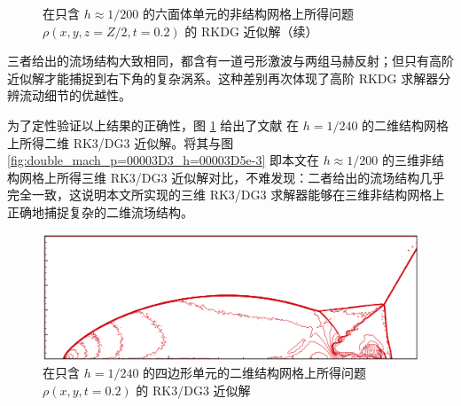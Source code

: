\begin{figure}[h!]
\begin{centering}
\par\end{centering}
\caption{在只含 $h\approx1/200$ 的六面体单元的非结构网格上所得问题
$\rho(x,y,z=Z/2,t=0.2)$ 的 RKDG 近似解（续）}
\end{figure}

三者给出的流场结构大致相同，都含有一道弓形激波与两组马赫反射；但只有高阶近似解才能捕捉到右下角的复杂涡系。这种差别再次体现了高阶 RKDG
求解器分辨流动细节的优越性。

为了定性验证以上结果的正确性，图 \ref{fig:double_mach_p=00003D3_zhong} 给出了文献 \cite{Zhong_2013}
在 $h=1/240$ 的二维结构网格上所得二维 RK3/DG3 近似解。将其与图 \ref{fig:double_mach_p=00003D3_h=00003D5e-3}
即本文在 $h\approx1/200$ 的三维非结构网格上所得三维 RK3/DG3 近似解对比，不难发现：二者给出的流场结构几乎完全一致，这说明本文所实现的三维
RK3/DG3 求解器能够在三维非结构网格上正确地捕捉复杂的二维流场结构。

\begin{figure}[h!]
\begin{centering}
\includegraphics[width=1\textwidth]{figures/double_mach/zhong}
\par\end{centering}
\caption{\label{fig:double_mach_p=00003D3_zhong}在只含 $h=1/240$ 的四边形单元的二维结构网格上所得问题
$\rho(x,y,t=0.2)$ 的 RK3/DG3 近似解}
\end{figure}

